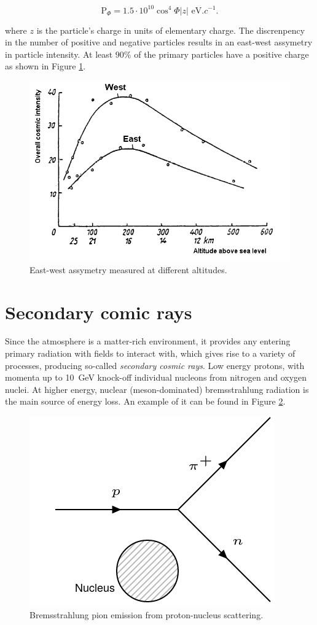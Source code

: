 \begin{equation}
\text{P}_\Phi=1.5\cdot 10^{10} \cos^4\Phi |z| \text{ eV}.c^{-1}.
\end{equation}

where $z$ is the particle's charge in units of elementary charge. The discrenpency in the number of positive and negative particles results in an east-west assymetry in particle intensity. At least $90\%$ of the primary particles have a positive charge as shown in Figure \ref{fig:assym}.

\begin{figure}[htbp] %
\centering
\includegraphics[width=0.8\linewidth]{./fig/assym.png}
\caption{East-west assymetry measured at different altitudes.}
\label{fig:assym}
\end{figure}


\section{Secondary comic rays}

Since the atmosphere is a matter-rich environment, it provides any entering primary radiation with fields to interact with, which gives rise to a variety of processes, producing so-called \textit{secondary cosmic rays}. Low energy protons, with momenta up to \SI{10}{GeV} knock-off individual nucleons from nitrogen and oxygen nuclei. At higher energy, nuclear (meson-dominated) bremsstrahlung radiation is the main source of energy loss. An example of it can be found in Figure \ref{fig:scat}. 

\begin{figure}[htbp]
\centering
\includegraphics[width=0.5\linewidth]{./fig/nscat.png}
\caption{Bremsstrahlung pion emission from proton-nucleus scattering.}
\label{fig:scat}
\end{figure}







